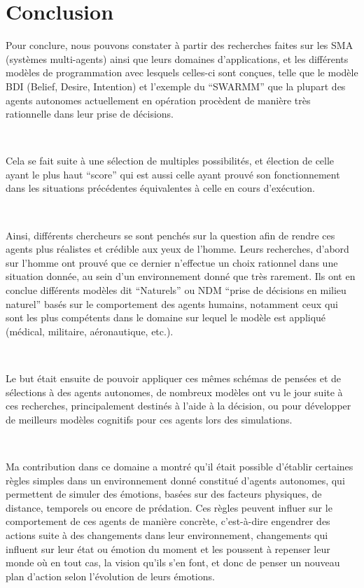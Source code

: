 \chapter{Conclusion} %

\label{Chapter7} %

Pour conclure, nous pouvons constater à partir des recherches faites sur les SMA (systèmes multi-agents) ainsi que leurs domaines d’applications, et les différents modèles de programmation avec lesquels celles-ci sont conçues, telle que le modèle BDI (Belief, Desire, Intention) et l'exemple du “SWARMM” que la plupart des agents autonomes  actuellement en opération procèdent de manière très rationnelle dans leur prise de décisions.

~\par
Cela se fait suite à une sélection de multiples possibilités, et élection de celle ayant le plus haut “score” qui est aussi celle ayant prouvé son fonctionnement dans les situations précédentes équivalentes à celle en cours d'exécution.

~\par
Ainsi, différents chercheurs se sont penchés sur la question afin de rendre ces agents plus réalistes et crédible aux yeux de l’homme. Leurs recherches, d’abord sur l’homme ont prouvé que ce dernier n'effectue un choix rationnel dans une situation donnée, au sein d’un environnement donné que très rarement. Ils ont en conclue différents modèles dit “Naturels” ou NDM “prise de décisions en milieu naturel” basés sur le comportement des agents humains, notamment ceux qui sont les plus compétents dans le domaine sur lequel le modèle est appliqué (médical, militaire, aéronautique, etc.).

~\par
Le but était ensuite de pouvoir appliquer ces mêmes schémas de pensées et de sélections à des agents autonomes, de nombreux modèles ont vu le jour suite à ces recherches, principalement destinés à l’aide à la décision, ou pour développer de meilleurs modèles cognitifs pour ces agents lors des simulations.

~\par
Ma contribution dans ce domaine a montré qu’il était possible d’établir certaines règles simples dans un environnement donné constitué d’agents autonomes, qui permettent de simuler des émotions, basées sur des facteurs physiques, de distance, temporels ou encore de prédation. Ces règles peuvent influer sur le comportement de ces agents de manière concrète, c’est-à-dire engendrer des actions suite à des changements dans leur environnement, changements qui influent sur leur état ou émotion du moment et les poussent à repenser leur monde où en tout cas, la vision qu’ils s’en font, et donc de penser un nouveau plan d’action selon l’évolution de leurs émotions.

